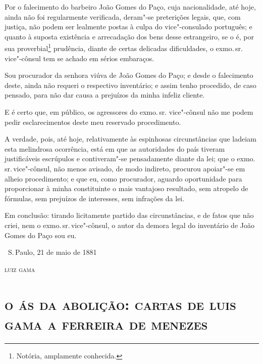 Por o falecimento do barbeiro João Gomes do Paço, cuja nacionalidade,
até hoje, ainda não foi regularmente verificada, deram"-se preterições
legais, que, com justiça, não podem ser lealmente postas à culpa do
vice"-consulado português; e quanto à suposta existência e arrecadação
dos bens desse estrangeiro, se o é, por sua proverbial\footnote{
  Notória, amplamente conhecida.}
prudência, diante de certas
delicadas dificuldades, o exmo.\,sr.\,vice"-cônsul tem se achado em sérios
embaraços.

Sou procurador da senhora viúva de João Gomes do Paço; e desde o
falecimento deste, ainda não requeri o respectivo inventário; e assim
tenho procedido, de caso pensado, para não dar causa a prejuízos da
minha infeliz cliente.

E é certo que, em público, os agressores do exmo.\,sr. vice"-cônsul não me
podem pedir esclarecimentos deste meu reservado procedimento.

A verdade, pois, até hoje, relativamente às espinhosas circunstâncias
que ladeiam esta melindrosa ocorrência, está em que as autoridades do
país tiveram justificáveis escrúpulos e contiveram"-se pensadamente
diante da lei; que o exmo.\,sr.\,vice"-cônsul, não menos avisado, de modo
indireto, procurou apoiar"-se em alheio procedimento; e que eu, como
procurador, aguardo oportunidade para proporcionar à minha constituinte
o mais vantajoso resultado, sem atropelo de fórmulas, sem prejuízos de
interesses, sem infrações da lei.

Em conclusão: tirando licitamente partido das circunstâncias, e de fatos
que não criei, nem o exmo.\,sr.\,vice"-cônsul, o autor da demora legal do
inventário de João Gomes do Paço sou eu.

\bigskip

\hfill\ S.\,Paulo, 21 de maio de 1881\smallskip

\hfill\textsc{luiz gama}

\paginabranca
\begingroup\makeatletter\@openrightfalse
\part[O ás da abolição: cartas de Gama a F.\,Menezes]{\textsc{o ás da abolição: cartas de luis\\ gama a ferreira de menezes}}

\pagebreak
\thispagestyle{empty}

